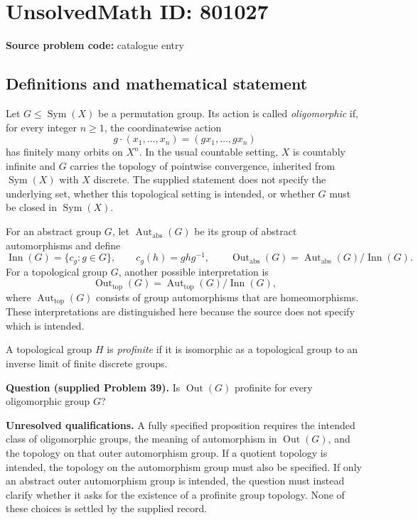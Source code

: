 \documentclass[11pt]{article}
\begin{document}
\section*{UnsolvedMath ID: 801027}
\textbf{Source problem code:} catalogue entry
\subsection{Definitions and mathematical statement}
Let \(G\leq\operatorname{Sym}(X)\) be a permutation group. Its action is called \emph{oligomorphic} if, for every integer \(n\geq 1\), the coordinatewise action
\[
 g\cdot(x_1,\ldots,x_n)=(gx_1,\ldots,gx_n)
\]
has finitely many orbits on \(X^n\). In the usual countable setting, \(X\) is countably infinite and \(G\) carries the topology of pointwise convergence, inherited from \(\operatorname{Sym}(X)\) with \(X\) discrete. The supplied statement does not specify the underlying set, whether this topological setting is intended, or whether \(G\) must be closed in \(\operatorname{Sym}(X)\).

For an abstract group \(G\), let \(\operatorname{Aut}_{\mathrm{abs}}(G)\) be its group of abstract automorphisms and define
\[
\operatorname{Inn}(G)=\{c_g:g\in G\},\qquad c_g(h)=ghg^{-1},\qquad
\operatorname{Out}_{\mathrm{abs}}(G)=\operatorname{Aut}_{\mathrm{abs}}(G)/\operatorname{Inn}(G).
\]
For a topological group \(G\), another possible interpretation is
\[
\operatorname{Out}_{\mathrm{top}}(G)
=\operatorname{Aut}_{\mathrm{top}}(G)/\operatorname{Inn}(G),
\]
where \(\operatorname{Aut}_{\mathrm{top}}(G)\) consists of group automorphisms that are homeomorphisms. These interpretations are distinguished here because the source does not specify which is intended.

A topological group \(H\) is \emph{profinite} if it is isomorphic as a topological group to an inverse limit of finite discrete groups.

\textbf{Question (supplied Problem 39).} Is \(\operatorname{Out}(G)\) profinite for every oligomorphic group \(G\)?

\textbf{Unresolved qualifications.} A fully specified proposition requires the intended class of oligomorphic groups, the meaning of automorphism in \(\operatorname{Out}(G)\), and the topology on that outer automorphism group. If a quotient topology is intended, the topology on the automorphism group must also be specified. If only an abstract outer automorphism group is intended, the question must instead clarify whether it asks for the existence of a profinite group topology. None of these choices is settled by the supplied record.
\end{document}

